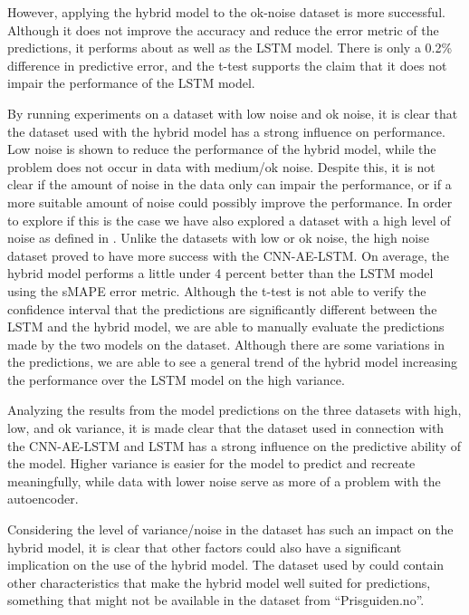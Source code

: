 However, applying the hybrid model to the ok-noise dataset is more successful.
Although it does not improve the accuracy and reduce the error metric of the predictions,
it performs about as well as the LSTM model. There is only a 0.2\% difference in predictive error,
and the t-test supports the claim that it does not impair the performance of the LSTM model.

By running experiments on a dataset with low noise and ok noise, it is clear that the dataset used with the hybrid model has a strong influence on performance.
Low noise is shown to reduce the performance of the hybrid model, while the problem does not occur in data with medium/ok noise.
Despite this, it is not clear if the amount of noise in the data only can impair the performance,
or if a more suitable amount of noise could possibly improve the performance.
In order to explore if this is the case we have also explored a dataset with a high level of noise as defined in .
Unlike the datasets with low or ok noise, the high noise dataset proved to have more success with the CNN-AE-LSTM.
On average, the hybrid model performs a little under 4 percent better than the LSTM model using the sMAPE error metric.
Although the t-test is not able to verify the confidence interval that the predictions are significantly different between the LSTM and the hybrid model,
we are able to manually evaluate the predictions made by the two models on the dataset.
Although there are some variations in the predictions, we are able to see a general trend of the hybrid model increasing the performance over the LSTM model on the high variance.

Analyzing the results from the model predictions on the three datasets with high, low, and ok variance,
it is made clear that the dataset used in connection with the CNN-AE-LSTM and LSTM
has a strong influence on the predictive ability of the model.
Higher variance is easier for the model to predict and recreate meaningfully,
while data with lower noise serve as more of a problem with the autoencoder.

Considering the level of variance/noise in the dataset has such an impact on the hybrid model, it
is clear that other factors could also have a significant implication on the use of the hybrid model.
The dataset used by \cite{Zhao2019} could contain other characteristics that make the hybrid model well suited for predictions,
something that might not be available in the dataset from ``Prisguiden.no''.


